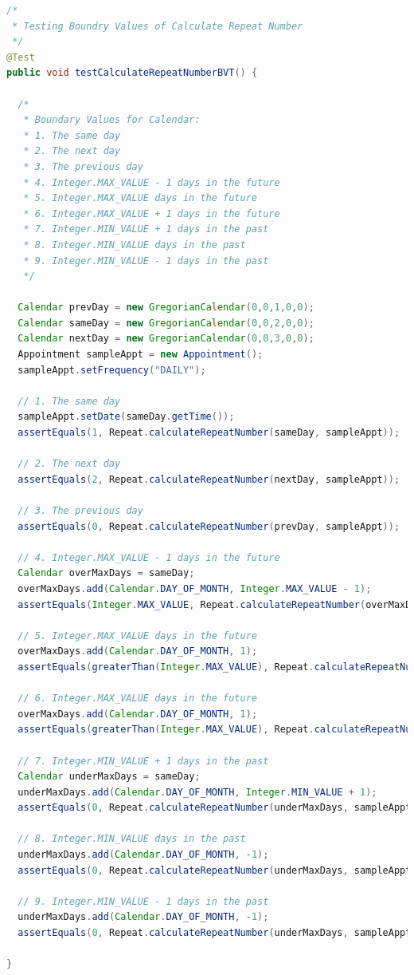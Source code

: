 \begin{lstlisting}[language=Java]
/*
 * Testing Boundry Values of Calculate Repeat Number
 */
@Test
public void testCalculateRepeatNumberBVT() {

  /*
   * Boundary Values for Calendar:
   * 1. The same day
   * 2. The next day
   * 3. The previous day
   * 4. Integer.MAX_VALUE - 1 days in the future
   * 5. Integer.MAX_VALUE days in the future
   * 6. Integer.MAX_VALUE + 1 days in the future
   * 7. Integer.MIN_VALUE + 1 days in the past
   * 8. Integer.MIN_VALUE days in the past
   * 9. Integer.MIN_VALUE - 1 days in the past
   */

  Calendar prevDay = new GregorianCalendar(0,0,1,0,0);
  Calendar sameDay = new GregorianCalendar(0,0,2,0,0);
  Calendar nextDay = new GregorianCalendar(0,0,3,0,0);
  Appointment sampleAppt = new Appointment();
  sampleAppt.setFrequency("DAILY");

  // 1. The same day
  sampleAppt.setDate(sameDay.getTime());
  assertEquals(1, Repeat.calculateRepeatNumber(sameDay, sampleAppt));

  // 2. The next day
  assertEquals(2, Repeat.calculateRepeatNumber(nextDay, sampleAppt));

  // 3. The previous day
  assertEquals(0, Repeat.calculateRepeatNumber(prevDay, sampleAppt));

  // 4. Integer.MAX_VALUE - 1 days in the future
  Calendar overMaxDays = sameDay;
  overMaxDays.add(Calendar.DAY_OF_MONTH, Integer.MAX_VALUE - 1);
  assertEquals(Integer.MAX_VALUE, Repeat.calculateRepeatNumber(overMaxDays, sampleAppt));

  // 5. Integer.MAX_VALUE days in the future
  overMaxDays.add(Calendar.DAY_OF_MONTH, 1);
  assertEquals(greaterThan(Integer.MAX_VALUE), Repeat.calculateRepeatNumber(overMaxDays, sampleAppt));

  // 6. Integer.MAX_VALUE days in the future
  overMaxDays.add(Calendar.DAY_OF_MONTH, 1);
  assertEquals(greaterThan(Integer.MAX_VALUE), Repeat.calculateRepeatNumber(overMaxDays, sampleAppt));

  // 7. Integer.MIN_VALUE + 1 days in the past
  Calendar underMaxDays = sameDay;
  underMaxDays.add(Calendar.DAY_OF_MONTH, Integer.MIN_VALUE + 1);
  assertEquals(0, Repeat.calculateRepeatNumber(underMaxDays, sampleAppt));

  // 8. Integer.MIN_VALUE days in the past
  underMaxDays.add(Calendar.DAY_OF_MONTH, -1);
  assertEquals(0, Repeat.calculateRepeatNumber(underMaxDays, sampleAppt));

  // 9. Integer.MIN_VALUE - 1 days in the past
  underMaxDays.add(Calendar.DAY_OF_MONTH, -1);
  assertEquals(0, Repeat.calculateRepeatNumber(underMaxDays, sampleAppt));

}
\end{lstlisting}

